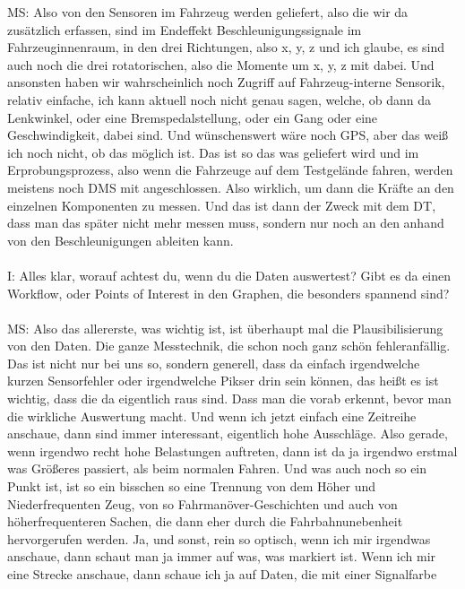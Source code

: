 \begin{linenumbers}
MS: Also von den Sensoren im Fahrzeug werden geliefert, also die wir da zusätzlich erfassen, sind im Endeffekt Beschleunigungssignale im Fahrzeuginnenraum, in den drei Richtungen, also x, y, z und ich glaube, es sind auch noch die drei rotatorischen, also die Momente um x, y, z mit dabei. Und ansonsten haben wir wahrscheinlich noch Zugriff auf Fahrzeug-interne Sensorik, relativ einfache, ich kann aktuell noch nicht genau sagen, welche, ob dann da Lenkwinkel, oder eine Bremspedalstellung, oder ein Gang oder eine Geschwindigkeit, dabei sind. Und wünschenswert wäre noch GPS, aber das weiß ich noch nicht, ob das möglich ist. Das ist so das was geliefert wird und im Erprobungsprozess, also wenn die Fahrzeuge auf dem Testgelände fahren, werden meistens noch \ac{DMS} mit angeschlossen. Also wirklich, um dann die Kräfte an den einzelnen Komponenten zu messen. Und das ist dann der Zweck mit dem \ac{DT}, dass man das später nicht mehr messen muss, sondern nur noch an den anhand von den Beschleunigungen ableiten kann.\\\\
I: Alles klar, worauf achtest du, wenn du die Daten auswertest? Gibt es da einen Workflow, oder Points of Interest in den Graphen, die besonders spannend sind?\\\\
MS: Also das allererste, was wichtig ist, ist überhaupt mal die Plausibilisierung von den Daten. Die ganze Messtechnik, die schon noch ganz schön fehleranfällig. Das ist nicht nur bei uns so, sondern generell, dass da einfach irgendwelche kurzen Sensorfehler oder irgendwelche Pikser drin sein können, das heißt es ist wichtig, dass die da eigentlich raus sind. Dass man die vorab erkennt, bevor man die wirkliche Auswertung macht. Und wenn ich jetzt einfach eine Zeitreihe anschaue, dann sind immer interessant, eigentlich hohe Ausschläge. Also gerade, wenn irgendwo recht hohe Belastungen auftreten, dann ist da ja irgendwo erstmal was Größeres passiert, als beim normalen Fahren. Und was auch noch so ein Punkt ist, ist so ein bisschen so eine Trennung von dem Höher und Niederfrequenten Zeug, von so Fahrmanöver-Geschichten und auch von höherfrequenteren Sachen, die dann eher durch die Fahrbahnunebenheit hervorgerufen werden. Ja, und sonst, rein so optisch, wenn ich mir irgendwas anschaue, dann schaut man ja immer auf was, was markiert ist. Wenn ich mir eine Strecke anschaue, dann schaue ich ja auf Daten, die mit einer Signalfarbe 

\end{linenumbers}
